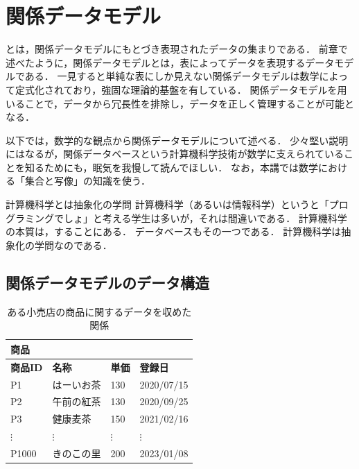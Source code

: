 \chapter{関係データモデル}

 とは，関係データモデルにもとづき表現されたデータの集まりである．
前章で述べたように，関係データモデルとは，表によってデータを表現するデータモデルである．
一見すると単純な表にしか見えない関係データモデルは数学によって定式化されており，強固な理論的基盤を有している．
関係データモデルを用いることで，データから冗長性を排除し，データを正しく管理することが可能となる．

以下では，数学的な観点から関係データモデルについて述べる．
少々堅い説明にはなるが，関係データベースという計算機科学技術が数学に支えられていることを知るためにも，眠気を我慢して読んでほしい．
なお，本講では数学における「集合と写像」の知識を使う．


\begin{notebox}{計算機科学とは抽象化の学問}
計算機科学（あるいは情報科学）というと「プログラミングでしょ」と考える学生は多いが，それは間違いである．
計算機科学の本質は，することにある．
データベースもその一つである．
計算機科学は抽象化の学問なのである．
\end{notebox}

\section{関係データモデルのデータ構造}
\begin{table}[tb]
\centering
\caption{ある小売店の商品に関するデータを収めた関係}
\label{tab:correct-table}
\begin{tabular}{@{}llll@{}}
商品            &             &             &              \\ \midrule
\textbf{商品ID} & \textbf{名称} & \textbf{単価} & \textbf{登録日} \\ \midrule
P1            & はーいお茶       & 130         & 2020/07/15   \\
P2            & 午前の紅茶       & 130         & 2020/09/25   \\
P3            & 健康麦茶        & 150         & 2021/02/16   \\
$\vdots$      & $\vdots$    & $\vdots$    & $\vdots$     \\
P1000         & きのこの里       & 200         & 2023/01/08   \\ \bottomrule
\end{tabular}
\end{table}

